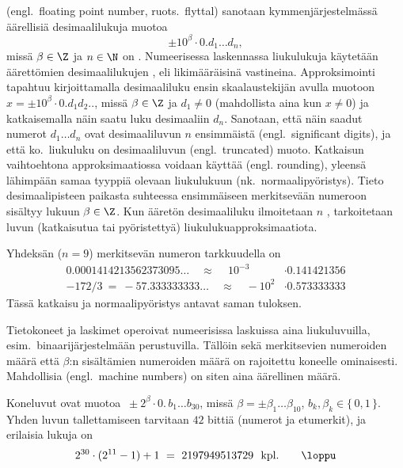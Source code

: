  (engl.\ floating point number, ruots.\ flyttal) sanotaan 
kymmenjärjestelmässä äärellisiä desimaalilukuja muotoa
\[
\pm 10^{\beta} \cdot 0 . d_1 \ldots d_n,
\]
missä $\beta\in\Z$ ja $n\in\N$ on . Numeerisessa laskennassa liukulukuja
käytetään äärettömien desimaalilukujen , eli likimääräisinä
vastineina. Approksimointi tapahtuu kirjoittamalla desimaaliluku ensin skaalaustekijän
avulla muotoon $x=\pm 10^\beta \cdot 0.d_1d_2..$, missä $\beta\in\Z$ ja $d_1 \neq 0$
(mahdollista aina kun $x \neq 0$) ja katkaisemalla näin saatu luku desimaaliin $d_n$.
Sanotaan, että näin saadut numerot $d_1 \ldots d_n$ ovat desimaaliluvun $n$ ensimmäistä 
%
 (engl.\ significant digits), ja että ko.\ liukuluku
on desimaaliluvun
%
 (engl.\ truncated) muoto. Katkaisun vaihtoehtona 
%
approksimaatiossa voidaan käyttää  (engl. rounding), yleensä lähimpään
samaa tyyppiä olevaan liukulukuun (nk.\ normaalipyöristys). Tieto desimaalipisteen paikasta
suhteessa ensimmäiseen merkitsevään numeroon sisältyy lukuun $\beta \in \Z$. Kun ääretön
desimaaliluku ilmoitetaan $n$ , tarkoitetaan luvun
(katkaisutua tai pyöristettyä) liukulukuapproksimaatiota.
\begin{Exa} Yhdeksän ($n=9$) merkitsevän numeron tarkkuudella on
\begin{align*}
0.0001414213562373095   \ldots \quad \approx \quad\, 10^{-3} &\cdot 0.141421356 \\
-172/3\ = \ -57.333333333 \ldots \quad \approx \quad   -10^2 &\cdot 0.573333333 
\end{align*} 
Tässä katkaisu ja normaalipyöristys antavat saman tuloksen. \loppu
\end{Exa}

Tietokoneet ja laskimet operoivat numeerisissa laskuissa aina liukuluvuilla, esim.\ 
binaarijärjestelmään perustuvilla. Tällöin sekä merkitsevien numeroiden määrä että $\beta$:n
sisältämien numeroiden määrä on rajoitettu koneelle ominaisesti. Mahdollisia
\index{koneluku}%
 (engl.\ machine numbers) on siten aina äärellinen määrä.
\begin{Exa} Koneluvut ovat muotoa $\ \pm 2^{\beta} \cdot 0 .\,b_1 \ldots b_{30}$, missä 
$\beta = \pm \beta_1 \ldots \beta_{10}$, $b_k, \beta_k \in \{\,0,1\,\}$. Yhden luvun 
tallettamiseen tarvitaan $42$ bittiä (numerot ja etumerkit), ja erilaisia lukuja on
\[
2^{30} \cdot (2^{11} - 1) + 1\ =\ 2197949513729\ \ \text{kpl.} \quad \quad \loppu
\]
\end{Exa}

